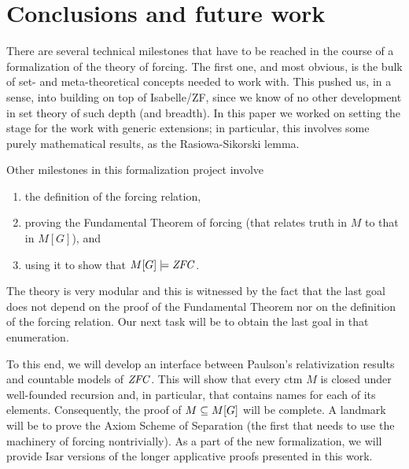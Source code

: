 \section{Conclusions and future work}
There are several technical milestones that have to be reached in the
course of a formalization of the theory of forcing. The first one, and most
obvious, is the bulk of set- and meta-theoretical concepts needed to work
with. This pushed us, in a sense,  into building on top of Isabelle/ZF,
since we know of no other development in set theory of such
depth (and breadth). In this paper we worked on setting the stage for the work with
generic extensions; in particular, this involves some purely mathematical
results, as the Rasiowa-Sikorski lemma. 

Other milestones in this formalization project
involve 
\begin{enumerate}
\item the definition
  of the forcing relation, 
\item proving the Fundamental Theorem of forcing
  (that relates truth in $M$ to that in $M[G]$), and 
\item using it to show
  that $M[G]\models \mathit{ZFC}$. 
\end{enumerate}
The theory is very modular and this is
witnessed by the fact 
that the last goal does not depend on the proof of the Fundamental
Theorem nor on the definition of the forcing relation. Our next task
will be to obtain the last goal in that enumeration. 

To this end, we will develop an interface between Paulson's
relativization results and countable models of $\mathit{ZFC}$. This will show
that every ctm $M$ is closed under well-founded recursion and, in
particular, that contains names for each of its
elements. Consequently, the proof of  $M\subseteq M[G]$ will be
complete. A landmark will be to prove the Axiom Scheme
of Separation (the first that needs to use the machinery of forcing
nontrivially). As a part of the new formalization, we will provide
Isar versions of the longer applicative proofs presented in this work.

